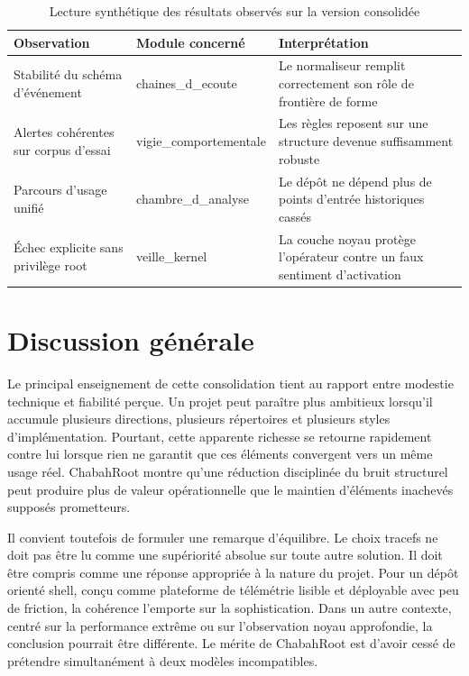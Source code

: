 \documentclass[12pt,a4paper]{report}
\begin{document}
\begin{table}[h]
\centering
\begin{tabular}{>{\raggedright\arraybackslash}p{4cm} >{\raggedright\arraybackslash}p{4cm} >{\raggedright\arraybackslash}p{5cm}}
\toprule
Observation & Module concerné & Interprétation \\
\midrule
Stabilité du schéma d’événement & chaines\_d\_ecoute & Le normaliseur remplit correctement son rôle de frontière de forme \\
Alertes cohérentes sur corpus d’essai & vigie\_comportementale & Les règles reposent sur une structure devenue suffisamment robuste \\
Parcours d’usage unifié & chambre\_d\_analyse & Le dépôt ne dépend plus de points d’entrée historiques cassés \\
Échec explicite sans privilège root & veille\_kernel & La couche noyau protège l’opérateur contre un faux sentiment d’activation \\
\bottomrule
\end{tabular}
\caption{Lecture synthétique des résultats observés sur la version consolidée}
\end{table}

\chapter*{Discussion générale}
Le principal enseignement de cette consolidation tient au rapport entre modestie technique et fiabilité perçue. Un projet peut paraître plus ambitieux lorsqu’il accumule plusieurs directions, plusieurs répertoires et plusieurs styles d’implémentation. Pourtant, cette apparente richesse se retourne rapidement contre lui lorsque rien ne garantit que ces éléments convergent vers un même usage réel. ChabahRoot montre qu’une réduction disciplinée du bruit structurel peut produire plus de valeur opérationnelle que le maintien d’éléments inachevés supposés prometteurs.

Il convient toutefois de formuler une remarque d’équilibre. Le choix tracefs ne doit pas être lu comme une supériorité absolue sur toute autre solution. Il doit être compris comme une réponse appropriée à la nature du projet. Pour un dépôt orienté shell, conçu comme plateforme de télémétrie lisible et déployable avec peu de friction, la cohérence l’emporte sur la sophistication. Dans un autre contexte, centré sur la performance extrême ou sur l’observation noyau approfondie, la conclusion pourrait être différente. Le mérite de ChabahRoot est d’avoir cessé de prétendre simultanément à deux modèles incompatibles.
\end{document}
